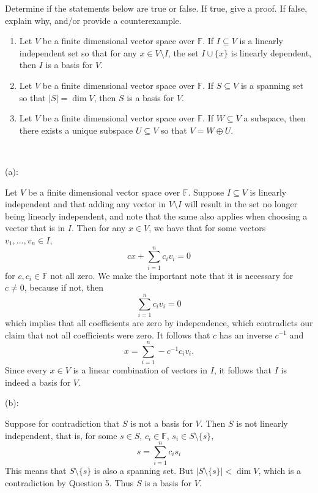 \documentclass{article}
\theoremstyle{plain} %
\numberwithin{thm}{section} %
\theoremstyle{definition}
\begin{document}
    \newpage
    \begin{question}{11}
        Determine if the statements below are true or false. If true, give a proof. If false, explain why, and/or provide a counterexample.
        
        \begin{enumerate}[label=(\alph*)]
            \item Let \( V \) be a finite dimensional vector space over \( \mathbb{F} \). If \( I \subseteq V \) is a linearly independent set so that for any \( x \in V \setminus I \), the set \( I \cup \{ x \} \) is linearly dependent, then \( I \) is a basis for \( V \).
            \item Let \( V \) be a finite dimensional vector space over \( \mathbb{F} \). If \( S \subseteq V \) is a spanning set so that \( |S| = \dim V \), then \( S \) is a basis for \( V \).
            \item Let \( V \) be a finite dimensional vector space over \( \mathbb{F} \). If \( W \subseteq V \) a subspace, then there exists a unique subspace \( U \subseteq V \) so that \( V = W \oplus U \).
        \end{enumerate}
        \tcblower
        \ 

        (a):

        Let \(V\) be a finite dimensional vector space over \(\mathbb{F}\). Suppose \(I \subseteq V\) is linearly independent and that adding any vector in \(V\setminus I\) will result in the set no longer being linearly independent, and note that the same also applies when choosing a vector that is in \(I\). Then for any \(x \in V\), we have that for some vectors \(v_1, ..., v_n \in I\),
        \[
            cx + \sum_{i=1}^{n} c_i v_i = 0
        \]
        for \(c, c_i \in \mathbb{F}\) not all zero. We make the important note that it is necessary for \(c \neq 0\), because if not, then
        \[
            \sum_{i=1}^{n} c_i v_i = 0
        \]
        which implies that all coefficients are zero by independence, which contradicts our claim that not all coefficients were zero. It follows that \(c\) has an inverse \(c^{-1}\) and
        \[
            x = \sum_{i=1}^{n} -c^{-1}c_i v_i.
        \]
        Since every \(x \in V\) is a linear combination of vectors in \(I\), it follows that \(I\) is indeed a basis for \(V\).

        \medskip

        (b):

        Suppose for contradiction that \(S\) is not a basis for \(V\). Then \(S\) is not linearly independent, that is, for some \(s \in S\), \(c_i \in \mathbb{F}\), \(s_i \in S\setminus \{ s \}\),
        \[
            s = \sum_{i=1}^{n} c_i s_i
        \]
        This means that \(S\setminus \{ s \}\) is also a spanning set. But \(|S\setminus \{ s \} | < \dim V\), which is a contradiction by Question 5. Thus \(S\) is a basis for \(V\).


\end{question}
\end{document}
